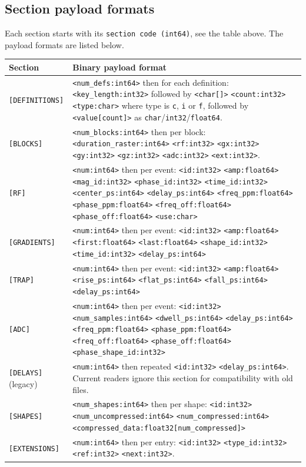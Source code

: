 \documentclass{article}
\begin{document}
\subsection{Section payload formats}

Each section starts with its \verb.section code (int64)., see the table above. The payload formats are listed below.

\begin{center}
\begin{tabularx}{\textwidth}{lX}
\toprule
Section & Binary payload format \\
\midrule
\verb.[DEFINITIONS]. & \verb.<num_defs:int64>. then for each definition: \verb.<key_length:int32>. followed by \verb.<char[]>. \verb.<count:int32>. \verb.<type:char>. where type is \verb.c., \verb.i. or \verb.f., followed by \verb.<value[count]>. as \verb.char./\verb.int32./\verb.float64.. \\
\verb.[BLOCKS]. & \verb.<num_blocks:int64>. then per block: \verb.<duration_raster:int64>. \verb.<rf:int32>. \verb.<gx:int32>. \verb.<gy:int32>. \verb.<gz:int32>. \verb.<adc:int32>. \verb.<ext:int32>.. \\
\verb.[RF]. & \verb.<num:int64>. then per event: \verb.<id:int32>. \verb.<amp:float64>. \verb.<mag_id:int32>. \verb.<phase_id:int32>. \verb.<time_id:int32>. \verb.<center_ps:int64>. \verb.<delay_ps:int64>. \verb.<freq_ppm:float64>. \verb.<phase_ppm:float64>. \verb.<freq_off:float64>. \verb.<phase_off:float64>. \verb.<use:char>. \\
\verb.[GRADIENTS]. & \verb.<num:int64>. then per event: \verb.<id:int32>. \verb.<amp:float64>. \verb.<first:float64>. \verb.<last:float64>. \verb.<shape_id:int32>. \verb.<time_id:int32>. \verb.<delay_ps:int64>. \\
\verb.[TRAP]. & \verb.<num:int64>. then per event: \verb.<id:int32>. \verb.<amp:float64>. \verb.<rise_ps:int64>. \verb.<flat_ps:int64>. \verb.<fall_ps:int64>. \verb.<delay_ps:int64>. \\
\verb.[ADC]. & \verb.<num:int64>. then per event: \verb.<id:int32>. \verb.<num_samples:int64>. \verb.<dwell_ps:int64>. \verb.<delay_ps:int64>. \verb.<freq_ppm:float64>. \verb.<phase_ppm:float64>. \verb.<freq_off:float64>. \verb.<phase_off:float64>. \verb.<phase_shape_id:int32>. \\
\verb.[DELAYS]. (legacy) & \verb.<num:int64>. then repeated \verb.<id:int32>. \verb.<delay_ps:int64>.. Current readers ignore this section for compatibility with old files. \\
\verb.[SHAPES]. & \verb.<num_shapes:int64>. then per shape: \verb.<id:int32>. \verb.<num_uncompressed:int64>. \verb.<num_compressed:int64>. \verb.<compressed_data:float32[num_compressed]>. \\
\verb.[EXTENSIONS]. & \verb.<num:int64>. then per entry: \verb.<id:int32>. \verb.<type_id:int32>. \verb.<ref:int32>. \verb.<next:int32>.. \\
\bottomrule
\end{tabularx}
\end{center}
\end{document}
